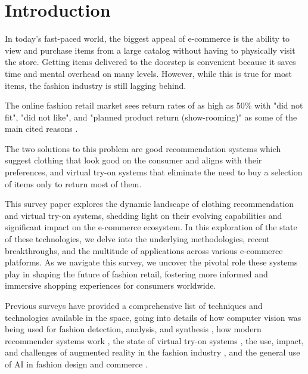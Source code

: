 \section{Introduction} \label{section:intro}
	In today's fast-paced world, the biggest appeal of e-commerce is the ability to view and purchase items from a large catalog without having to physically visit the store. Getting items delivered to the doorstep is convenient because it saves time and mental overhead on many levels. However, while this is true for most items, the fashion industry is still lagging behind.

	The online fashion retail market sees return rates of as high as 50\% with "did not fit", "did not like", and "planned product return (show-rooming)" as some of the main cited reasons \cite{stocker2021new}.

	The two solutions to this problem are good recommendation systems which suggest clothing that look good on the consumer and aligns with their preferences, and virtual try-on systems that eliminate the need to buy a selection of items only to return most of them.

	This survey paper explores the dynamic landscape of clothing recommendation and virtual try-on systems, shedding light on their evolving capabilities and significant impact on the e-commerce ecosystem. In this exploration of the state of these technologies, we delve into the underlying methodologies, recent breakthroughs, and the multitude of applications across various e-commerce platforms. As we navigate this survey, we uncover the pivotal role these systems play in shaping the future of fashion retail, fostering more informed and immersive shopping experiences for consumers worldwide.

	Previous surveys have provided a comprehensive list of techniques and technologies available in the space, going into details of how computer vision was being used for fashion detection, analysis, and synthesis \cite{DBLP:journals/csur/ChengSCHL21, Jain_Wah_2022}, how modern recommender systems work \cite{DBLP:journals/corr/abs-2202-02757, DBLP:journals/sncs/ShirkhaniMSH23}, the state of virtual try-on systems \cite{DBLP:journals/corr/abs-2111-00905, DBLP:journals/mta/GhodhbaniNRA22, DBLP:journals/cvm/LiangL21}, the use, impact, and challenges of augmented reality in the fashion industry \cite{menon2020impact, jayamini2021use, DBLP:journals/corr/abs-2202-09450, huang2019enhancing, mehta2020enhancement, zak2020augmented, caboni2019augmented}, and the general use of AI in fashion design and commerce \cite{DBLP:journals/access/GiriJZB19, DBLP:journals/corr/abs-2105-03050, DBLP:journals/access/GuoZLCCW23, DBLP:journals/spm/ChenSC23, sahni2021review, liang2020implementation, sareen2022ai, 10153335, DBLP:journals/tmm/Yan0LZX0Y23}.

